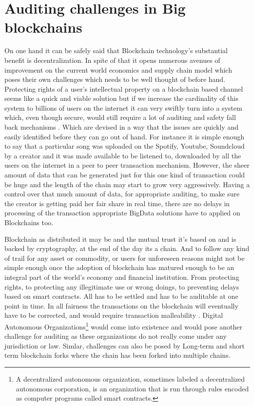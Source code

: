 \section{Auditing challenges in Big blockchains}
On one hand it can be safely said that Blockchain technology's substantial benefit is decentralization. In spite of that it opens numerous avenues of improvement on the current world economics and supply chain model which poses their own challenges which needs to be well thought of before hand. Protecting rights of a user's intellectual property on a blockchain based channel seems like a quick and viable solution but if we increase the cardinality of this system to billions of users on the internet it can very swiftly turn into a system which, even though secure, would still require a lot of auditing and safety fall back mechanisms \cite{smith31}. Which are devised in a way that the issues are quickly and easily identified before they can go out of hand. For instance it is simple enough to say that a particular song was uploaded on the Spotify, Youtube, Soundcloud by a creator and it was made available to be listened to, downloaded by all the users on the internet in a peer to peer transaction mechanism. However, the sheer amount of data that can be generated just for this one kind of transaction could be huge and the length of the chain may start to grow very aggressively. Having a control over that much amount of data, for appropriate auditing, to make sure the creator is getting paid her fair share in real time, there are no delays in processing of the transaction appropriate BigData solutions have to applied on Blockchains too.

Blockchain as distributed it may be and the mutual trust it's based on and is backed by cryptography, at the end of the day its a chain. And to follow any kind of trail for any asset or commodity, or users for unforeseen reasons might not be simple enough once the adoption of blockchain has matured enough to be an integral part of the world's economy and financial institution. From protecting rights, to protecting any illegitimate use or wrong doings, to preventing delays based on smart contracts. All has to be settled and has to be auditable at one point in time. In all fairness the transactions on the blockchain will eventually have to be corrected, and would require transaction malleability \cite{daniel32}. Digital Autonomous Organizations\footnote{A decentralized autonomous organization, sometimes labeled a decentralized autonomous corporation, is an organization that is run through rules encoded as computer programs called smart contracts.} would come into existence and would pose another challenge for auditing as these organizations do not really come under any jurisdiction or law. Simlar, challenges can also be posed by Long-term and short term blockchain forks where the chain has been forked into multiple chains.

